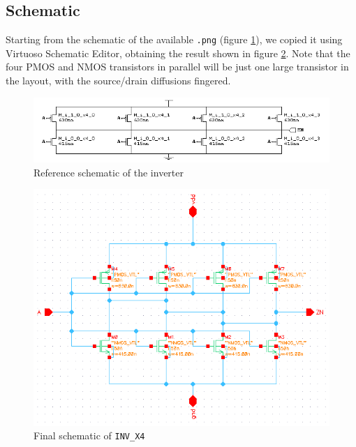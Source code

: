 \documentclass[a4paper]{article}
\newcommand{\inv}{\texttt{INV\_X4}\xspace}
\begin{document}
\subsection{Schematic}
\label{sec: inv_sch}
Starting from the schematic of the available \texttt{.png} (figure \ref{fig:inv_png}), we copied it using Virtuoso Schematic Editor, obtaining the result shown in figure \ref{fig:inv_schematic}. Note that the four PMOS and NMOS transistors in parallel will be just one large transistor in the layout, with the source/drain diffusions fingered.
\begin{figure}[H]
	\centering
	\includegraphics[width=1\linewidth]{../INV_X4/INV_X4.png}
	\caption{Reference schematic of the inverter}
	\label{fig:inv_png}
\end{figure}
\begin{figure}[H]
	\centering
	\includegraphics[width=\linewidth]{../INV_X4/INV_X4_schematic.png}
	\caption{Final schematic of \inv}
	\label{fig:inv_schematic}
\end{figure}
\end{document}
